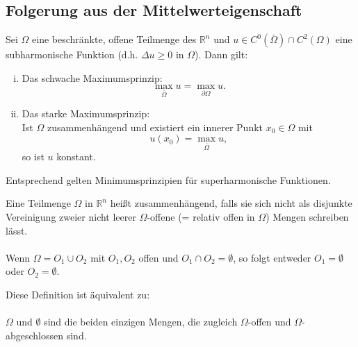 \subsection{Folgerung aus der Mittelwerteigenschaft} 
\label{sub:folgerung_aus_der_mittelwerteigenschaft}
\begin{satz}[Maximumsprinzipien]
	Sei $\Omega$ eine beschränkte, offene Teilmenge des $\mathbb{R}^n$ und $u \in C^0(\bar{\Omega}) \cap C^2(\Omega)$ eine subharmonische Funktion (d.h. $ \Delta u \geq 0$ in $\Omega$). Dann gilt:
	\begin{enumerate}[(i)]
		\item Das schwache Maximumsprinzip:
		\[
			\max_{\bar{\Omega}} u = \max_{\partial \Omega}u.
		\]
		\item Das starke Maximumsprinzip: \\
		Ist $\Omega$ zusammenhängend und existiert ein innerer Punkt $x_0 \in \Omega$ mit \[
			u(x_0) = \max_{ \bar{\Omega}} u,
		\]so ist $u$ konstant.
	\end{enumerate}
\end{satz}
\begin{bemerkung}
	Entsprechend gelten Minimumsprinzipien für superharmonische Funktionen.
\end{bemerkung}
\begin{definition*}
	Eine Teilmenge $\Omega$ in $\mathbb{R}^n$ heißt zusammenhängend,
	falls sie sich nicht als disjunkte Vereinigung zweier nicht leerer $\Omega$-offene (= relativ offen in $\Omega$) Mengen schreiben lässt. \\
	\\
	Wenn $\Omega = O_1 \cup O_2$ mit $O_1,O_2$ offen und $O_1 \cap O_2 = \emptyset$, so folgt entweder $O_1 = \emptyset$ oder $O_2 = \emptyset$.
\end{definition*}
\begin{bemerkung}
	Diese Definition ist äquivalent zu: \\
	\\
	$\Omega$ und $\emptyset$ sind die beiden einzigen Mengen, die zugleich $\Omega$-offen und $\Omega$-abgeschlossen sind.
\end{bemerkung}

